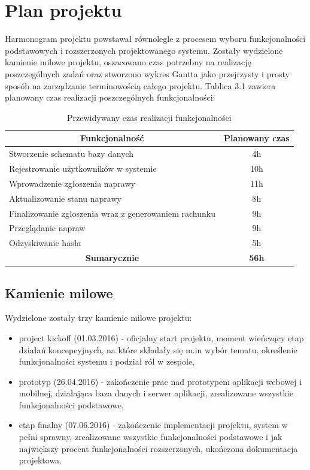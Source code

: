 \documentclass[a4paper,11pt]{article}
\begin{document}
\section{Plan projektu}
Harmonogram projektu powstawał równolegle z procesem wyboru funkcjonalności podstawowych i rozszerzonych projektowanego systemu. Zostały wydzielone kamienie milowe projektu, oszacowano czas potrzebny na realizację poszczególnych zadań oraz stworzono wykres Gantta jako przejrzysty i prosty sposób na zarządzanie terminowością całego projektu.
Tablica 3.1 zawiera planowany czas realizacji poszczególnych funkcjonalności:
\begin{table}[H]
	\centering
	\caption{Przewidywany czas realizacji funkcjonalności}
	\bgroup
\begin{tabular}{|l|c|}
	\hline
	\multicolumn{1}{|c|}{\textbf{Funkcjonalność}} & \textbf{Planowany czas} \\ \hline \hline
	 Stworzenie schematu bazy danych & 4h \\ \hline
	 Rejestrowanie użytkowników w systemie & 10h \\ \hline
	 Wprowadzenie zgłoszenia naprawy & 11h \\ \hline
	 Aktualizowanie stanu naprawy & 8h \\ \hline
	 Finalizowanie zgłoszenia wraz z generowaniem rachunku & 9h \\ \hline
	 Przeglądanie napraw & 9h \\ \hline
	 Odzyskiwanie hasła & 5h \\ \hline \hline
	 \multicolumn{1}{|c|}{\textbf{Sumarycznie}} & \textbf{56h} \\ \hline
\end{tabular}
\egroup
\end{table}
\subsection{Kamienie milowe}
Wydzielone zostały trzy kamienie milowe projektu:
\begin{itemize}
	\item project kickoff (01.03.2016) - oficjalny start projektu, moment wieńczący etap działań koncepcyjnych, na które składały się m.in wybór tematu, określenie funkcjonalności systemu i podział ról w zespole,
	\item prototyp (26.04.2016) - zakończenie prac nad prototypem aplikacji webowej i mobilnej, działająca baza danych i serwer aplikacji, zrealizowane wszystkie funkcjonalności podstawowe,
	\item etap finalny (07.06.2016) - zakończenie implementacji projektu, system w pełni sprawny, zrealizowane wszystkie funkcjonalności podstawowe i jak największy procent funkcjonalności rozszerzonych, ukończona dokumentacja projektowa.
\end{itemize}
\end{document}

